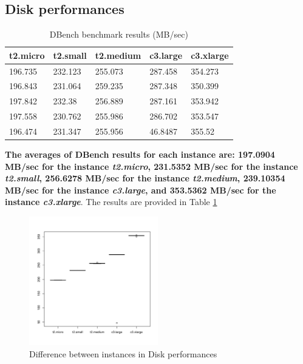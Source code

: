 \documentclass[10pt, conference]{IEEEtran}
\begin{document}
\subsection{Disk performances}


\begin{center}
\begin{table}
\begin{center}
\begin{tabular}{|l|l|l|l|l|}
  \hline
t2.micro & t2.small & 	t2.medium & 	c3.large & 	c3.xlarge \\
\hline 
196.735 &	232.123 &	255.073 &	287.458 & 354.273 \\
196.843 &	231.064 &	259.235 &	287.348 &	350.399 \\
197.842 &	232.38 &	256.889 &	287.161 &	353.942 \\
197.558 &	230.762 &	255.986 &	286.702 &	353.547 \\
196.474 &	231.347 &	255.956 &	46.8487 &	355.52 \\
\hline
\end{tabular}
\caption{\label{table:DBench2Results} DBench benchmark results (MB/sec)}
\end{center}
\end{table}
\end{center}

\textbf{The averages of DBench results for each instance are: 197.0904 MB/sec for the instance \textit{t2.micro}, 231.5352 MB/sec for the instance \textit{t2.small}, 256.6278 MB/sec for the instance \textit{t2.medium}, 239.10354 MB/sec for the instance \textit{c3.large}, and 353.5362 MB/sec for the instance \textit{c3.xlarge}}. The results are provided in Table \ref{table:DBench2Results}


\begin{figure}
\includegraphics[width=0.5\textwidth]{plots/dbench2.pdf}
\caption{Difference between instances in Disk performances}
\label{fig:dbench2}
\end{figure}
\end{document}
